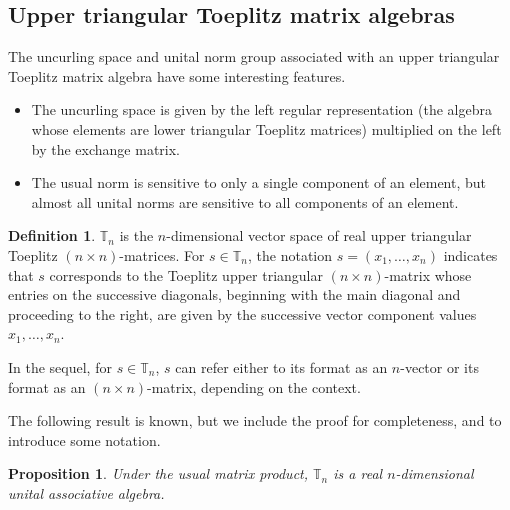 \documentclass{amsart}
\numberwithin{equation}{section}
\newtheorem{proposition}[theorem]{Proposition}
\theoremstyle{definition}
\newtheorem{definition}[theorem]{Definition}
\numberwithin{theorem}{section}
\begin{document}
\subsection{Upper triangular Toeplitz matrix algebras}

The uncurling space and unital norm group associated with an upper triangular Toeplitz matrix algebra have some interesting features.
\begin{itemize}\item The uncurling space is given by the left regular representation (the algebra whose elements are lower triangular Toeplitz matrices) multiplied on the left by the exchange matrix. \item The usual norm is sensitive to only a single component of an element, but almost all unital norms are sensitive to all components of an element.\end{itemize}

\bigskip
 
 \begin{definition}\label{5/4/22.1} $\mathbb{T}_n$ is the $n$-dimensional vector space of real upper triangular Toeplitz $(n\times n)$-matrices. For $s\in \mathbb{T}_n$, the notation $s=(x_1,\dots,x_n)$ indicates that $s$ corresponds to the Toeplitz upper triangular $(n\times n)$-matrix whose entries on the successive diagonals, beginning with the main diagonal and proceeding to the right, are given by the successive vector component values $x_1,\dots,x_n$.   
\end{definition}

In the sequel, for $s\in \mathbb{T}_n$, $s$ can refer either to its format as an $n$-vector or its format as an $(n\times n)$-matrix, depending on the context.

The following result is known, but we include the proof for completeness, and to introduce some notation.  
 \begin{proposition}\label{5/10/22.1} Under the usual matrix product, $\mathbb{T}_n$ is a real $n$-dimensional unital associative algebra.\end{proposition} 
 
\end{document}
